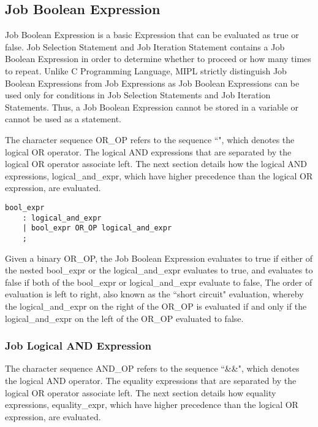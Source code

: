 \documentclass[prodmode,acmtecs]{acmsmall}
\begin{document}
\subsection{Job Boolean Expression}

Job Boolean Expression is a basic Expression that can be evaluated as
true or false.  Job Selection Statement and Job Iteration Statement
contains a Job Boolean Expression in order to determine whether to proceed
or how many times to repeat.  Unlike C Programming Language, MIPL strictly
distinguish Job Boolean Expressions from Job Expressions as Job Boolean
Expressions can be used only for conditions in Job Selection Statements
and Job Iteration Statements.  Thus, a Job Boolean Expression cannot be
stored in a variable or cannot be used as a statement.

The character sequence OR\_OP refers to the sequence ``\textbardbl", which  
denotes the logical OR operator. The logical AND expressions that are 
separated by the logical OR operator associate left. The next section 
details how the logical AND expressions, logical\_and\_expr, which have 
higher precedence than the logical OR expression, are evaluated. 

\begin{lstlisting}
bool_expr
	: logical_and_expr
	| bool_expr OR_OP logical_and_expr
	;
\end{lstlisting}

Given a binary OR\_OP, the Job Boolean Expression evaluates to true 
if either of the nested bool\_expr or the logical\_and\_expr evaluates
to true, and evaluates to false if both of the bool\_expr or
logical\_and\_expr evaluate to false, The order of evaluation is left
to right, also known as the ``short circuit" evaluation, whereby
the logical\_and\_expr on the right of the OR\_OP is evaluated if
and only if the logical\_and\_expr on the left of the OR\_OP 
evaluated to false. 
\medskip

\subsubsection{Job Logical AND Expression}

The character sequence AND\_OP refers to the sequence ``\&\&", which 
denotes the logical AND operator. The equality expressions that are 
separated by the logical OR operator associate left. The next section 
details how equality expressions, equality\_expr, which have higher 
precedence than the logical OR expression, are evaluated. 
\end{document}

